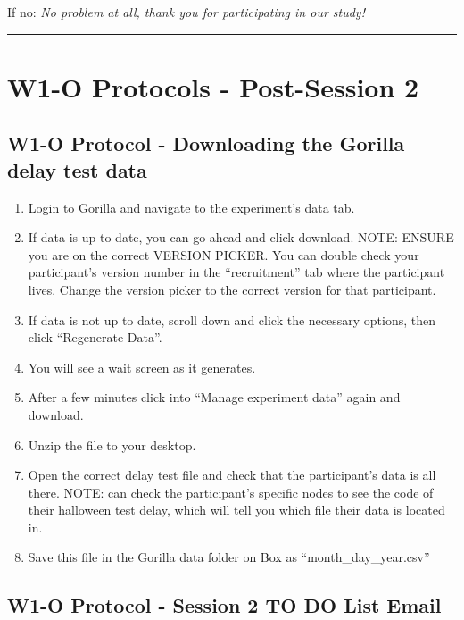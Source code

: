 \documentclass[]{book}
\begin{document}
If no: \emph{No problem at all, thank you for participating in our study!}

\begin{center}\rule{0.5\linewidth}{0.5pt}\end{center}

\hypertarget{w1-o-protocols---post-session-2}{%
\section{W1-O Protocols - Post-Session 2}\label{w1-o-protocols---post-session-2}}

\hypertarget{w1-o-protocol---downloading-the-gorilla-delay-test-data}{%
\subsection{W1-O Protocol - Downloading the Gorilla delay test data}\label{w1-o-protocol---downloading-the-gorilla-delay-test-data}}

\begin{enumerate}
\def\labelenumi{\arabic{enumi}.}
\item
  Login to Gorilla and navigate to the experiment's data tab.
\item
  If data is up to date, you can go ahead and click download. NOTE: ENSURE you are on the correct VERSION PICKER. You can double check your participant's version number in the ``recruitment'' tab where the participant lives. Change the version picker to the correct version for that participant.
\item
  If data is not up to date, scroll down and click the necessary options, then click ``Regenerate Data''.
\item
  You will see a wait screen as it generates.
\item
  After a few minutes click into ``Manage experiment data'' again and download.
\item
  Unzip the file to your desktop.
\item
  Open the correct delay test file and check that the participant's data is all there. NOTE: can check the participant's specific nodes to see the code of their halloween test delay, which will tell you which file their data is located in.
\item
  Save this file in the Gorilla data folder on Box as ``month\_day\_year.csv''
\end{enumerate}

\hypertarget{w1-o-protocol---session-2-to-do-list-email}{%
\subsection{W1-O Protocol - Session 2 TO DO List Email}\label{w1-o-protocol---session-2-to-do-list-email}}
\end{document}
